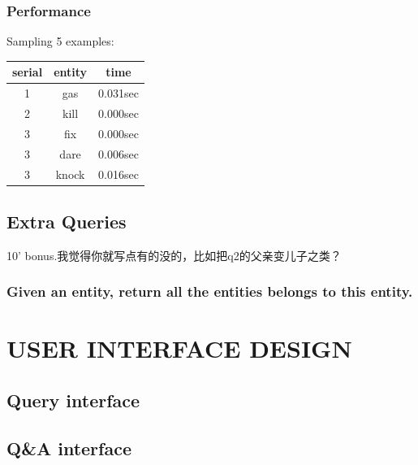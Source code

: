 \documentclass[12pt]{article}
\begin{document}
\subsubsection{Performance}
Sampling 5 examples:
\begin{center}
  \begin{tabular}{ | c | c | c |}
    \hline
    serial & entity & time \\ \hline
    1 & gas & 0.031sec \\ \hline
    2 & kill & 0.000sec \\ \hline
    3 & fix & 0.000sec \\ \hline
    3 & dare & 0.006sec \\ \hline
    3 & knock & 0.016sec \\
    \hline
  \end{tabular}
\end{center}
\subsection{Extra Queries}
10' bonus.我觉得你就写点有的没的，比如把q2的父亲变儿子之类？
\subsubsection{Given an entity, return all the entities belongs to this entity.}
\section{USER INTERFACE DESIGN}
\subsection{Query interface}
\subsection{Q\&A interface}
\end{document}
